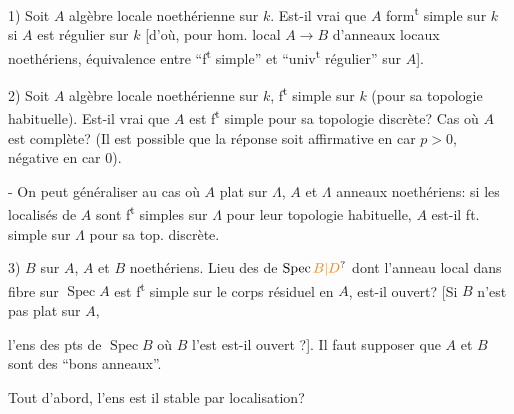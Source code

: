 1) Soit $A$ algèbre locale noethérienne sur $k$. Est-il vrai que $A$ form\textsuperscript{t} simple sur $k$ si $A$ est  régulier sur $k$  [d'où, pour hom. local $A\longrightarrow B$ d'anneaux locaux noethériens, équivalence entre ``f\textsuperscript{t} simple'' et ``univ\textsuperscript{t} régulier''  sur $A$].

2) Soit $A$ algèbre locale noethérienne sur $k$, f\textsuperscript{t} simple sur $k$ (pour sa topologie habituelle). Est-il vrai que $A$ est f\textsuperscript{t} simple pour sa topologie discrète? Cas où $A$ est complète? (Il est possible que la réponse soit affirmative en car $p>0$, négative en car $0$).

 

- On peut généraliser au cas où  $A$ plat sur $\Lambda$, $A$ et $\Lambda$ anneaux noethériens: si les localisés de $A$ sont f\textsuperscript{t} simples sur  $\Lambda$ pour leur topologie habituelle, $A$ est-il ft. simple sur $\Lambda$ pour sa top. discrète.


3) $B$   sur $A$, $A$ et $B$ noethériens. Lieu des  de $\operatorname{Spec}\unsure{B|D}$ dont l'anneau local dans  fibre sur $\operatorname{Spec} A$ est f\textsuperscript{t} simple sur le corps résiduel en $A$, est-il ouvert? \deleted{[N.B: \unsure{même au|Lieu en}} [Si $B$ n'est pas plat sur $A$,

l'ens des pts de $\operatorname{Spec} B$ où $B$ l'est est-il ouvert ?]. Il faut supposer que $A$ et $B$ sont des ``bons anneaux''. 

Tout d'abord, l'ens  est il  stable par localisation? 



